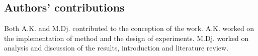 \documentclass{bmcart}
\begin{document}
\begin{backmatter}
\section*{Authors' contributions}
Both A.K. and M.Dj. contributed to the conception of the work. A.K. worked on the implementation of method and the design of experiments. M.Dj. worked on analysis and discussion of the results, introduction and literature review. 



 
 


 

 
 

 

\end{backmatter}
\end{document}
